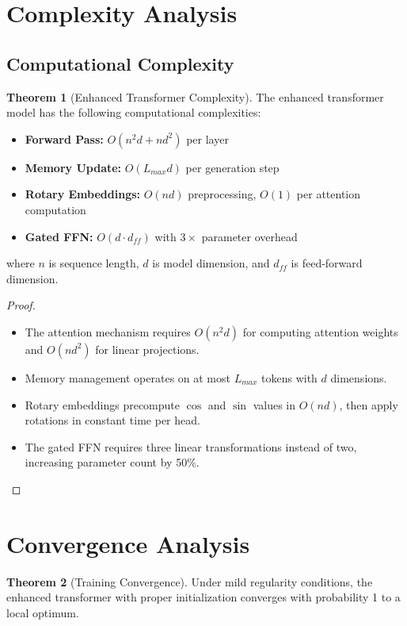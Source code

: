 \documentclass[12pt]{article}
\theoremstyle{definition}
\newtheorem{theorem}{Theorem}
\begin{document}
\section{Complexity Analysis}

\subsection{Computational Complexity}

\begin{theorem}[Enhanced Transformer Complexity]
The enhanced transformer model has the following computational complexities:
\begin{itemize}
\item \textbf{Forward Pass:} $O(n^2 d + nd^2)$ per layer
\item \textbf{Memory Update:} $O(L_{max} d)$ per generation step  
\item \textbf{Rotary Embeddings:} $O(nd)$ preprocessing, $O(1)$ per attention computation
\item \textbf{Gated FFN:} $O(d \cdot d_{ff})$ with $3\times$ parameter overhead
\end{itemize}
where $n$ is sequence length, $d$ is model dimension, and $d_{ff}$ is feed-forward dimension.
\end{theorem}

\begin{proof}
\begin{itemize}
\item The attention mechanism requires $O(n^2 d)$ for computing attention weights and $O(nd^2)$ for linear projections.
\item Memory management operates on at most $L_{max}$ tokens with $d$ dimensions.
\item Rotary embeddings precompute $\cos$ and $\sin$ values in $O(nd)$, then apply rotations in constant time per head.
\item The gated FFN requires three linear transformations instead of two, increasing parameter count by 50\%.
\end{itemize}
\end{proof}

\section{Convergence Analysis}

\begin{theorem}[Training Convergence]
Under mild regularity conditions, the enhanced transformer with proper initialization converges with probability 1 to a local optimum.
\end{theorem}
\end{document}
